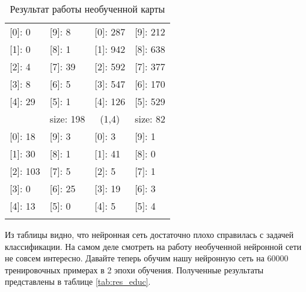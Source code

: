 \documentclass[a4paper,12pt]{report}
\begin{document}
\begin{longtable}[c]{llll}
{[}0{]}: 0 & {[}9{]}: 8 & {[}0{]}: 287 & {[}9{]}: 212 \\
{[}1{]}: 0 & {[}8{]}: 1 & {[}1{]}: 942 & {[}8{]}: 638 \\
{[}2{]}: 4 & {[}7{]}: 39 & {[}2{]}: 592 & {[}7{]}: 377 \\
{[}3{]}: 8 & {[}6{]}: 5 & {[}3{]}: 547 & {[}6{]}: 170 \\
{[}4{]}: 29 & {[}5{]}: 1 & {[}4{]}: 126 & {[}5{]}: 529 \\
\rowcolor[HTML]{D9D9D9} 
\multicolumn{1}{c}{\cellcolor[HTML]{D9D9D9}(0,4)} & \multicolumn{1}{c}{\cellcolor[HTML]{D9D9D9}size: 198} & \multicolumn{1}{c}{\cellcolor[HTML]{D9D9D9}(1,4)} & \multicolumn{1}{c}{\cellcolor[HTML]{D9D9D9}size: 82} \\
{[}0{]}: 18 & {[}9{]}: 3 & {[}0{]}: 3 & {[}9{]}: 1 \\
{[}1{]}: 30 & {[}8{]}: 1 & {[}1{]}: 41 & {[}8{]}: 0 \\
{[}2{]}: 103 & {[}7{]}: 5 & {[}2{]}: 5 & {[}7{]}: 1 \\
{[}3{]}: 0 & {[}6{]}: 25 & {[}3{]}: 19 & {[}6{]}: 3 \\
{[}4{]}: 13 & {[}5{]}: 0 & {[}4{]}: 5 & {[}5{]}: 4 \\
\caption{Результат работы необученной карты}
\label{tab:res_no_educ}\\
\end{longtable}

Из таблицы видно, что нейронная сеть достаточно плохо справилась с
задачей классификации. На самом деле смотреть на работу необученной
нейронной сети не совсем интересно. Давайте теперь обучим нашу
нейронную сеть на 60000 тренировочных примерах в 2 эпохи обучения.
Полученные результаты представлены в таблице \ref{tab:res_educ}.
\end{document}
